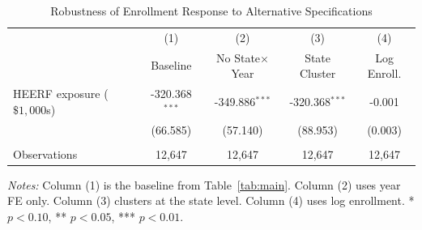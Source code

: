 \begin{table}[H]
\centering
\caption{Robustness of Enrollment Response to Alternative Specifications}
\begin{threeparttable}
\begin{tabular}{lcccc}
\toprule
& (1) & (2) & (3) & (4) \\
& Baseline & No State$\times$Year & State Cluster & Log Enroll. \\
\midrule
HEERF exposure ($\$1{,}000$s) & -320.368$^{***}$ & -349.886$^{***}$ & -320.368$^{***}$ & -0.001 \\
 & (66.585) & (57.140) & (88.953) & (0.003) \\
\\
Observations & 12,647 & 12,647 & 12,647 & 12,647 \\
\bottomrule
\end{tabular}
\begin{tablenotes}[flushleft]
\small
\item \textit{Notes:} Column (1) is the baseline from Table~\ref{tab:main}. Column (2) uses year FE only. Column (3) clusters at the state level. Column (4) uses log enrollment. * $p<0.10$, ** $p<0.05$, *** $p<0.01$.
\end{tablenotes}
\end{threeparttable}
\label{tab:robustness}
\end{table}
